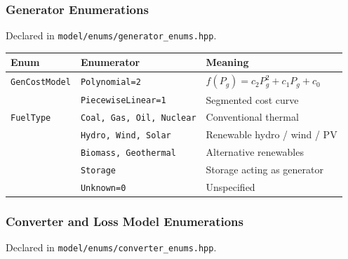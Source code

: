 \subsubsection{Generator Enumerations}
\label{sec:gen-enums}

Declared in \texttt{model/enums/generator\_enums.hpp}.

\begin{center}
\begin{tabular}{lll}
\hline\hline
\textbf{Enum} & \textbf{Enumerator} & \textbf{Meaning} \\
\hline
\texttt{GenCostModel} & \texttt{Polynomial=2} & \(f(P_g)=c_2 P_g^2+c_1 P_g+c_0\) \\
 & \texttt{PiecewiseLinear=1} & Segmented cost curve \\
\hline
\texttt{FuelType} & \texttt{Coal, Gas, Oil, Nuclear} & Conventional thermal \\
 & \texttt{Hydro, Wind, Solar} & Renewable hydro / wind / PV \\
 & \texttt{Biomass, Geothermal} & Alternative renewables \\
 & \texttt{Storage} & Storage acting as generator \\
 & \texttt{Unknown=0} & Unspecified \\
\hline\hline
\end{tabular}
\end{center}

\subsubsection{Converter and Loss Model Enumerations}
\label{sec:converter-enums}

Declared in \texttt{model/enums/converter\_enums.hpp}.

